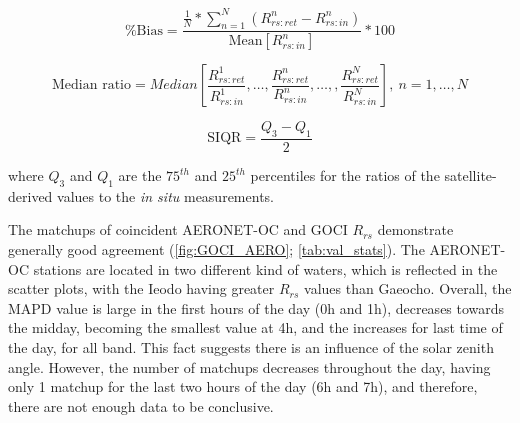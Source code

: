 \documentclass[onecolumn,3p,letterpaper,11pt]{elsarticle}
\begin{document}
\begin{linenomath*}
\begin{equation}
    \text{\% Bias} = \frac{\displaystyle \frac{1}{N}*\sum_{n=1}^N(R_{rs:ret}^n-R_{rs:in}^n)}{\text{Mean}[R_{rs:in}^n]}*100
\end{equation}
\end{linenomath*}
\begin{linenomath*}
\begin{equation}
  \text{Median ratio} =  Median\left[\frac{R_{rs:ret}^1}{R_{rs:in}^1},\dots,\frac{R_{rs:ret}^n}{R_{rs:in}^n},\dots,,\frac{R_{rs:ret}^N}{R_{rs:in}^N}\right],\ n=1,\dots,N
\end{equation}
\end{linenomath*}
\begin{linenomath*}
\begin{equation}
    \text{SIQR} = \frac{Q_3-Q_1}{2}
\end{equation}
\end{linenomath*}
\noindent where $Q_3$ and $Q_1$ are the $75^{th}$ and $25^{th}$ percentiles for the ratios of the satellite-derived values to the {\it in situ} measurements.  

The matchups of coincident AERONET-OC and GOCI $R_{rs}$ demonstrate generally good agreement (\autoref{fig:GOCI_AERO}; \autoref{tab:val_stats}). 
The AERONET-OC stations are located in two different kind of waters, which is reflected in the scatter plots, with the Ieodo having greater $R_{rs}$ values than Gaeocho. Overall, the MAPD value is large in the first hours of the day (0h and 1h), decreases towards the midday, becoming the smallest value at 4h, and the increases for last time of the day, for all band. This fact suggests there is an influence of the solar zenith angle. However, the number of matchups decreases throughout the day, having only 1 matchup for the last two hours of the day (6h and 7h), and therefore, there are not enough data to be conclusive. 
\end{document}
